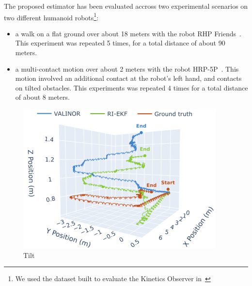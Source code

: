 \documentclass{IJCAS}
\begin{document}
The proposed estimator has been evaluated accross two experimental scenarios on two different humanoid robots\footnote{We used the dataset built to evaluate the Kinetics Observer in~\cite{Demont2024KineticsObserver}}:
\begin{itemize}
    \item a walk on a flat ground over about 18 meters with the robot RHP Friends~\cite{Benallegue2025RhpFriendsJRL}. This experiment was repeated 5 times, for a total distance of about 90 meters. 
    \item a multi-contact motion over about 2 meters with the robot HRP-5P~\cite{Kaneko2019Hrp5}. This motion involved an additional contact at the robot's left hand, and contacts on tilted obstacles. This experiments was repeated 4 times for a total distance of about 8 meters.
\end{itemize}

\begin{figure}[!t]
\begin{center}
\includegraphics[width=\columnwidth]{Uploaded/Images/trajectory_rhps1_3d.png} 
\vskip -0.5pc
\caption{Tilt}\label{fig:trajRhps1}
\end{center}
\vskip -1.5pc
\end{figure}
\end{document}
